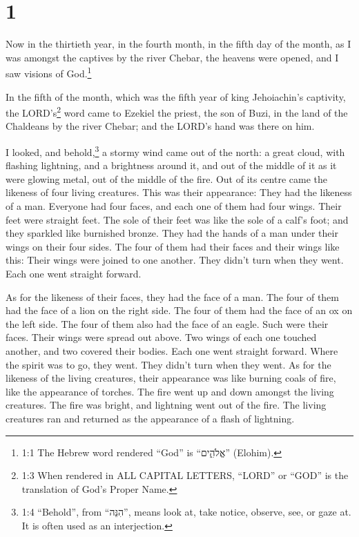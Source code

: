 \hypertarget{section}{%
\section{1}\label{section}}

 Now in the thirtieth year, in the fourth month, in the
fifth day of the month, as I was amongst the captives by the river
Chebar, the heavens were opened, and I saw visions of God.\footnote{1:1
  The Hebrew word rendered ``God'' is ``אֱלֹהִ֑ים'' (Elohim).}

 In the fifth of the month, which was the fifth year of king
Jehoiachin's captivity,  the LORD's\footnote{1:3 When
  rendered in ALL CAPITAL LETTERS, ``LORD'' or ``GOD'' is the
  translation of God's Proper Name.} word came to Ezekiel the priest,
the son of Buzi, in the land of the Chaldeans by the river Chebar; and
the LORD's hand was there on him.

 I looked, and behold,\footnote{1:4 ``Behold'', from
  ``הִנֵּה'', means look at, take notice, observe, see, or gaze at. It
  is often used as an interjection.} a stormy wind came out of the
north: a great cloud, with flashing lightning, and a brightness around
it, and out of the middle of it as it were glowing metal, out of the
middle of the fire.  Out of its centre came the likeness of
four living creatures. This was their appearance: They had the likeness
of a man.  Everyone had four faces, and each one of them had
four wings.  Their feet were straight feet. The sole of
their feet was like the sole of a calf's foot; and they sparkled like
burnished bronze.  They had the hands of a man under their
wings on their four sides. The four of them had their faces and their
wings like this:  Their wings were joined to one another.
They didn't turn when they went. Each one went straight forward.

 As for the likeness of their faces, they had the face of a
man. The four of them had the face of a lion on the right side. The four
of them had the face of an ox on the left side. The four of them also
had the face of an eagle.  Such were their faces. Their
wings were spread out above. Two wings of each one touched another, and
two covered their bodies.  Each one went straight forward.
Where the spirit was to go, they went. They didn't turn when they went.
 As for the likeness of the living creatures, their
appearance was like burning coals of fire, like the appearance of
torches. The fire went up and down amongst the living creatures. The
fire was bright, and lightning went out of the fire.  The
living creatures ran and returned as the appearance of a flash of
lightning.

